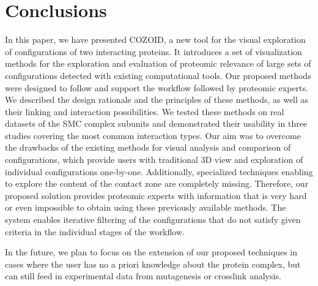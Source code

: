 \documentclass{bmcart}
\begin{document}
\section*{Conclusions}
In this paper, we have presented COZOID, a new tool for the visual exploration of configurations of two interacting proteins. 
It introduces a set of visualization methods for the exploration and evaluation of proteomic relevance of large sets of configurations detected with existing computational tools.
Our proposed methods were designed to follow and support the workflow followed by proteomic experts.
We described the design rationale and the principles of these methods, as well as their linking and interaction possibilities. 
We tested these methods on real datasets of the SMC complex subunits and demonstrated their usability in three studies covering the most common interaction types.
Our aim was to overcome the drawbacks of the existing methods for visual analysis and comparison of configurations, which provide users with traditional 3D view and exploration of individual configurations one-by-one.
Additionally, specialized techniques enabling to explore the content of the contact zone are completely missing. 
Therefore, our proposed solution provides proteomic experts with information that is very hard or even impossible to obtain using these previously available methods.
The system enables iterative filtering of the configurations that do not satisfy given criteria in the individual stages of the workflow.

In the future, we plan to focus on the extension of our proposed techniques in cases where the user has no a priori knowledge about the protein complex, but can still feed in experimental data from mutagenesis or crosslink analysis.

\end{document}
